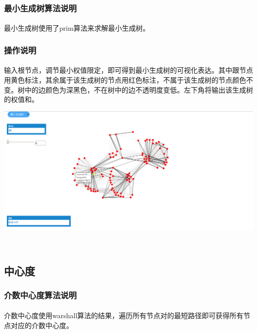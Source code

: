 \documentclass{article}
\begin{document}
\begin{CJK}{UTF8}{gkai}
		\subsubsection{最小生成树算法说明} %
			\paragraph{}
			最小生成树使用了prim算法来求解最小生成树。
		\subsubsection{操作说明}
			\paragraph{}
			输入根节点，调节最小权值限定，即可得到最小生成树的可视化表达。其中跟节点用黄色标注，其余属于该生成树的节点用红色标注，不属于该生成树的节点颜色不变。树中的边颜色为深黑色，不在树中的边不透明度变低。左下角将输出该生成树的权值和。
		\\[\intextsep] 
		\begin{minipage}{\textwidth} 
		    \centering 
		    \includegraphics[width=0.9\linewidth]{mst.PNG}
		\end{minipage} 
		\\[\intextsep] 	

	\subsection{中心度}
		\subsubsection{介数中心度算法说明} %
			\paragraph{}
			介数中心度使用warshall算法的结果，遍历所有节点对的最短路径即可获得所有节点对应的介数中心度。

\end{CJK}
\end{document}
